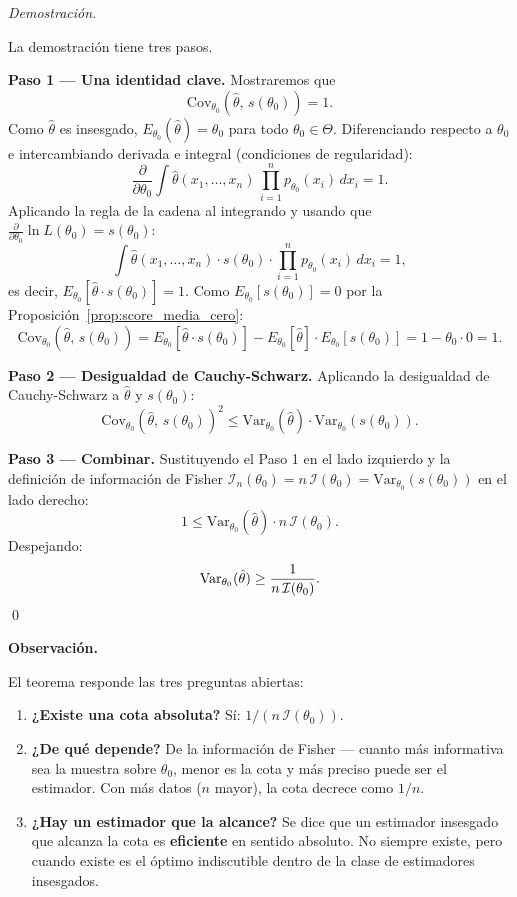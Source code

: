\documentclass[12pt, a4paper]{book}
\newenvironment{observacion}{%
    \par\medskip\noindent\textbf{\color{azul}Observaci\'{o}n.}\enspace\itshape
}{\par\medskip}
\renewenvironment{proof}{%
    \par\medskip\noindent\textit{Demostraci\'{o}n.}\enspace
}{\qed\par\medskip}
\numberwithin{equation}{chapter}
\begin{document}
\begin{proof}
	La demostraci\'{o}n tiene tres pasos.
	
	\medskip
	\textbf{Paso 1 --- Una identidad clave.}
	Mostraremos que
	\[
	\mathrm{Cov}_{\theta_0}(\hat{\theta},\,
	s(\theta_0)) = 1.
	\]
	Como $\hat{\theta}$ es insesgado,
	$E_{\theta_0}(\hat{\theta}) = \theta_0$ para todo
	$\theta_0 \in \Theta$. Diferenciando respecto a
	$\theta_0$ e intercambiando derivada e integral
	(condiciones de regularidad):
	\[
	\frac{\partial}{\partial\theta_0}
	\int \hat{\theta}(x_1,\ldots,x_n)\,
	\prod_{i=1}^n p_{\theta_0}(x_i)\,dx_i = 1.
	\]
	Aplicando la regla de la cadena al integrando y
	usando que $\frac{\partial}{\partial\theta_0}
	\ln L(\theta_0) = s(\theta_0)$:
	\[
	\int \hat{\theta}(x_1,\ldots,x_n)\cdot
	s(\theta_0)\cdot\prod_{i=1}^n
	p_{\theta_0}(x_i)\,dx_i = 1,
	\]
	es decir, $E_{\theta_0}[\hat{\theta}\cdot
	s(\theta_0)] = 1$. Como $E_{\theta_0}[s(\theta_0)]
	= 0$ por la
	Proposici\'{o}n~\ref{prop:score_media_cero}:
	\[
	\mathrm{Cov}_{\theta_0}(\hat{\theta},\,
	s(\theta_0))
	= E_{\theta_0}[\hat{\theta}\cdot s(\theta_0)]
	- E_{\theta_0}[\hat{\theta}]\cdot
	E_{\theta_0}[s(\theta_0)]
	= 1 - \theta_0 \cdot 0 = 1.
	\]
	
	\medskip
	\textbf{Paso 2 --- Desigualdad de Cauchy-Schwarz.}
	Aplicando la desigualdad de Cauchy-Schwarz a
	$\hat{\theta}$ y $s(\theta_0)$:
	\[
	\mathrm{Cov}_{\theta_0}(\hat{\theta},\,
	s(\theta_0))^2 \leq
	\mathrm{Var}_{\theta_0}(\hat{\theta})\cdot
	\mathrm{Var}_{\theta_0}(s(\theta_0)).
	\]
	
	\medskip
	\textbf{Paso 3 --- Combinar.}
	Sustituyendo el Paso 1 en el lado izquierdo y la
	definici\'{o}n de informaci\'{o}n de Fisher
	$\mathcal{I}_n(\theta_0) = n\,\mathcal{I}(\theta_0)
	= \mathrm{Var}_{\theta_0}(s(\theta_0))$ en el
	lado derecho:
	\[
	1 \leq \mathrm{Var}_{\theta_0}(\hat{\theta})
	\cdot n\,\mathcal{I}(\theta_0).
	\]
	Despejando:
	\[
	\mathrm{Var}_{\theta_0}(\hat{\theta}) \geq
	\frac{1}{n\,\mathcal{I}(\theta_0)}. \qedhere
	\]
\end{proof}

\begin{observacion}
	El teorema responde las tres preguntas abiertas:
	\begin{enumerate}[label=\textbf{\roman*)}]
		\item \textbf{¿Existe una cota absoluta?} Sí:
		$1/(n\,\mathcal{I}(\theta_0))$.
		\item \textbf{¿De qu\'{e} depende?} De la
		informaci\'{o}n de Fisher --- cuanto m\'{a}s
		informativa sea la muestra sobre $\theta_0$,
		menor es la cota y m\'{a}s preciso puede ser
		el estimador. Con m\'{a}s datos ($n$ mayor),
		la cota decrece como $1/n$.
		\item \textbf{¿Hay un estimador que la alcance?}
		Se dice que un estimador insesgado que alcanza
		la cota es \textbf{eficiente} en sentido
		absoluto. No siempre existe, pero cuando existe
		es el \'{o}ptimo indiscutible dentro de la
		clase de estimadores insesgados.
	\end{enumerate}
\end{observacion}
\end{document}
